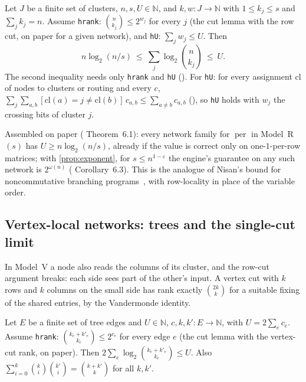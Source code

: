 \documentclass[10pt]{amsart}
\theoremstyle{plain}
\theoremstyle{definition}
\theoremstyle{remark}
\numberwithin{equation}{section}
\newcommand{\N}{\mathbb{N}}
\newcommand{\per}{\operatorname{per}}
\begin{document}
\begin{theorem}\label{thm:modelR}
Let $J$ be a finite set of clusters, $n,s,U\in\N$, and $k,w:J\to\N$ with $1\le k_j\le s$ and
$\sum_jk_j=n$. Assume \texttt{hrank}: $\binom n{k_j}\le2^{w_j}$ for every $j$ (the cut lemma with the
row cut, on paper for a given network), and \texttt{hU}: $\sum_jw_j\le U$. Then
\[
  n\log_2(n/s)\ \le\ \sum_{j}\log_2\binom n{k_j}\ \le\ U.
\]
The second inequality needs only \texttt{hrank} and \texttt{hU} (). For
\texttt{hU}: for every assignment $\mathrm{cl}$ of nodes to clusters or routing and every $c$,
$\sum_{j}\sum_{a,b}[\mathrm{cl}(a)=j\ne\mathrm{cl}(b)]\,c_{a,b}\le\sum_{a\ne b}c_{a,b}$
(), so \texttt{hU} holds with $w_j$ the crossing bits of cluster $j$.
\end{theorem}

\noindent Assembled on paper ( Theorem~6.1): every network family for $\per$ in
Model~R$(s)$ has $U\ge n\log_2(n/s)$, already if the value is correct only on one-$1$-per-row
matrices; with \cref{prop:exponent}, for $s\le n^{1-\varepsilon}$ the engine's guarantee on any such
network is $2^{\omega(n)}$ ( Corollary~6.3). This is the analogue of Nisan's bound
for noncommutative branching programs~\cite{Nisan91}, with row-locality in place of the variable order.

\subsection{Vertex-local networks: trees and the single-cut limit}\label{sec:modelV}
In Model~V a node also reads the columns of its cluster, and the row-cut argument breaks: each side
sees part of the other's input. A vertex cut with $k$ rows and $k$ columns on the small side has
rank exactly $\binom{2k}k$ for a suitable fixing of the shared entries, by the Vandermonde identity.

\begin{theorem}\label{thm:tree}
Let $E$ be a finite set of tree edges and $U\in\N$, $c,k,k':E\to\N$, with $U=2\sum_ec_e$. Assume
\texttt{hrank}: $\binom{k_e+k'_e}{k_e}\le2^{c_e}$ for every edge $e$ (the cut lemma with the vertex-cut
rank, on paper). Then $2\sum_e\log_2\binom{k_e+k'_e}{k_e}\le U$. Also
$\sum_{i=0}^{k}\binom ki\binom{k'}i=\binom{k+k'}k$ for all $k,k'$.
\end{theorem}
\end{document}
